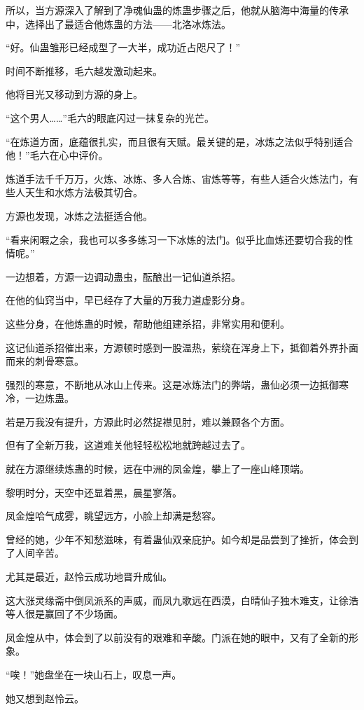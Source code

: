 \begin{this_body}
所以，当方源深入了解到了净魂仙蛊的炼蛊步骤之后，他就从脑海中海量的传承中，选择出了最适合他炼蛊的方法——北洛冰炼法。

“好。仙蛊雏形已经成型了一大半，成功近占咫尺了！”

时间不断推移，毛六越发激动起来。

他将目光又移动到方源的身上。

“这个男人……”毛六的眼底闪过一抹复杂的光芒。

“在炼道方面，底蕴很扎实，而且很有天赋。最关键的是，冰炼之法似乎特别适合他！”毛六在心中评价。

炼道手法千千万万，火炼、冰炼、多人合炼、宙炼等等，有些人适合火炼法门，有些人天生和水炼方法极其切合。

方源也发现，冰炼之法挺适合他。

“看来闲暇之余，我也可以多多练习一下冰炼的法门。似乎比血炼还要切合我的性情呢。”

一边想着，方源一边调动蛊虫，酝酿出一记仙道杀招。

在他的仙窍当中，早已经存了大量的万我力道虚影分身。

这些分身，在他炼蛊的时候，帮助他组建杀招，非常实用和便利。

这记仙道杀招催出来，方源顿时感到一股温热，萦绕在浑身上下，抵御着外界扑面而来的刺骨寒意。

强烈的寒意，不断地从冰山上传来。这是冰炼法门的弊端，蛊仙必须一边抵御寒冷，一边炼蛊。

若是万我没有提升，方源此时必然捉襟见肘，难以兼顾各个方面。

但有了全新万我，这道难关他轻轻松松地就跨越过去了。

就在方源继续炼蛊的时候，远在中洲的凤金煌，攀上了一座山峰顶端。

黎明时分，天空中还显着黑，晨星寥落。

凤金煌哈气成雾，眺望远方，小脸上却满是愁容。

曾经的她，少年不知愁滋味，有着蛊仙双亲庇护。如今却是品尝到了挫折，体会到了人间辛苦。

尤其是最近，赵怜云成功地晋升成仙。

这大涨灵缘斋中倒凤派系的声威，而凤九歌远在西漠，白晴仙子独木难支，让徐浩等人很是赢回了不少场面。

凤金煌从中，体会到了以前没有的艰难和辛酸。门派在她的眼中，又有了全新的形象。

“唉！”她盘坐在一块山石上，叹息一声。

她又想到赵怜云。


\end{this_body}
